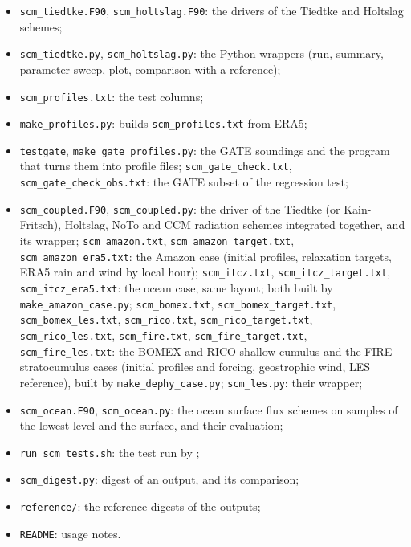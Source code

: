 \begin{itemize}
  \item \verb=scm_tiedtke.F90=, \verb=scm_holtslag.F90=: the drivers of
        the Tiedtke and Holtslag schemes;
  \item \verb=scm_tiedtke.py=, \verb=scm_holtslag.py=: the Python wrappers
        (run, summary, parameter sweep, plot, comparison with a reference);
  \item \verb=scm_profiles.txt=: the test columns;
  \item \verb=make_profiles.py=: builds \verb=scm_profiles.txt= from ERA5;
  \item \verb=testgate=, \verb=make_gate_profiles.py=: the GATE soundings
        and the program that turns them into profile files;
        \verb=scm_gate_check.txt=, \verb=scm_gate_check_obs.txt=: the
        GATE subset of the regression test;
  \item \verb=scm_coupled.F90=, \verb=scm_coupled.py=: the driver of the
        Tiedtke (or Kain-Fritsch), Holtslag, NoTo and CCM radiation
        schemes integrated
        together, and its wrapper;
        \verb=scm_amazon.txt=, \verb=scm_amazon_target.txt=,
        \verb=scm_amazon_era5.txt=: the Amazon case (initial profiles,
        relaxation targets, ERA5 rain and wind by local hour);
        \verb=scm_itcz.txt=, \verb=scm_itcz_target.txt=,
        \verb=scm_itcz_era5.txt=: the ocean case, same layout; both
        built by \verb=make_amazon_case.py=;
        \verb=scm_bomex.txt=, \verb=scm_bomex_target.txt=,
        \verb=scm_bomex_les.txt=, \verb=scm_rico.txt=,
        \verb=scm_rico_target.txt=, \verb=scm_rico_les.txt=,
        \verb=scm_fire.txt=, \verb=scm_fire_target.txt=,
        \verb=scm_fire_les.txt=: the BOMEX and RICO shallow cumulus and
        the FIRE stratocumulus cases (initial profiles and forcing,
        geostrophic wind, LES reference), built by
        \verb=make_dephy_case.py=; \verb=scm_les.py=: their wrapper;
  \item \verb=scm_ocean.F90=, \verb=scm_ocean.py=: the ocean surface flux
        schemes on samples of the lowest level and the surface, and their
        evaluation;
  \item \verb=run_scm_tests.sh=: the test run by ;
  \item \verb=scm_digest.py=: digest of an output, and its comparison;
  \item \verb=reference/=: the reference digests of the outputs;
  \item \verb=README=: usage notes.
\end{itemize}

